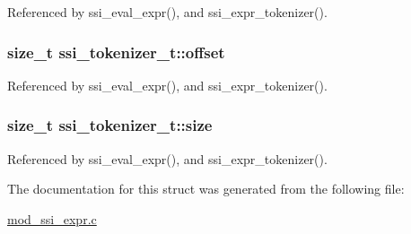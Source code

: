 Referenced by ssi\-\_\-eval\-\_\-expr(), and ssi\-\_\-expr\-\_\-tokenizer().

\hypertarget{structssi__tokenizer__t_aeb19813b49fdb8894fa51ca01b7f8962}{
\subsubsection[{offset}]{\setlength{\rightskip}{0pt plus 5cm}size\-\_\-t ssi\-\_\-tokenizer\-\_\-t\-::offset}}\label{structssi__tokenizer__t_aeb19813b49fdb8894fa51ca01b7f8962}


Referenced by ssi\-\_\-eval\-\_\-expr(), and ssi\-\_\-expr\-\_\-tokenizer().

\hypertarget{structssi__tokenizer__t_a0ab7f1a6e97b14bcf9420108fee372eb}{
\subsubsection[{size}]{\setlength{\rightskip}{0pt plus 5cm}size\-\_\-t ssi\-\_\-tokenizer\-\_\-t\-::size}}\label{structssi__tokenizer__t_a0ab7f1a6e97b14bcf9420108fee372eb}


Referenced by ssi\-\_\-eval\-\_\-expr(), and ssi\-\_\-expr\-\_\-tokenizer().



The documentation for this struct was generated from the following file\-:\begin{DoxyCompactItemize}
\item 
\hyperlink{mod__ssi__expr_8c}{mod\-\_\-ssi\-\_\-expr.\-c}\end{DoxyCompactItemize}
